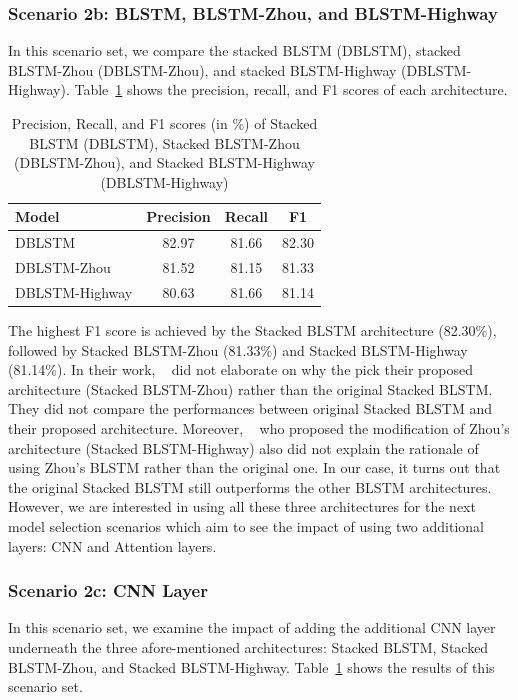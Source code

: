 {{\subsubsection{Scenario 2b: BLSTM, BLSTM-Zhou, and BLSTM-Highway}
In this scenario set, we compare the stacked BLSTM (DBLSTM), stacked BLSTM-Zhou (DBLSTM-Zhou), and stacked BLSTM-Highway (DBLSTM-Highway). Table~\ref{tab:modelselection2} shows the precision, recall, and F1 scores of each architecture.

\begin{table}
	\caption{Precision, Recall, and F1 scores (in \%) of Stacked BLSTM (DBLSTM), Stacked BLSTM-Zhou (DBLSTM-Zhou), and Stacked BLSTM-Highway (DBLSTM-Highway)}
	\centering
	\label{tab:modelselection2}
	\begin{tabular}{lccc}
		\hline
		Model & Precision & Recall & F1 \\
		\hline		\hline
		DBLSTM & 82.97 & 81.66 & 82.30 \\
		DBLSTM-Zhou & 81.52 & 81.15 & 81.33 \\
		DBLSTM-Highway & 80.63 & 81.66 & 81.14 \\
		\hline
	\end{tabular}

\end{table}

The highest F1 score is achieved by the Stacked BLSTM architecture (82.30\%), followed by Stacked BLSTM-Zhou (81.33\%) and Stacked BLSTM-Highway (81.14\%). In their work, ~\cite{zhou2015end} did not elaborate on why the pick their proposed architecture (Stacked BLSTM-Zhou) rather than the original Stacked BLSTM. They did not compare the performances between original Stacked BLSTM and their proposed architecture. Moreover, ~\cite{he2017deep} who proposed the modification of Zhou's architecture (Stacked BLSTM-Highway) also did not explain the rationale of using Zhou's BLSTM rather than the original one. In our case, it turns out that the original Stacked BLSTM still outperforms the other BLSTM architectures. However, we are interested in using all these three architectures for the next model selection scenarios which aim to see the impact of using two additional layers: CNN and Attention layers.

\subsubsection{Scenario 2c: CNN Layer}
In this scenario set, we examine the impact of adding the additional CNN layer underneath the three afore-mentioned architectures: Stacked BLSTM, Stacked BLSTM-Zhou, and Stacked BLSTM-Highway. Table~\ref{tab:modelselection2} shows the results of this scenario set.

}}
